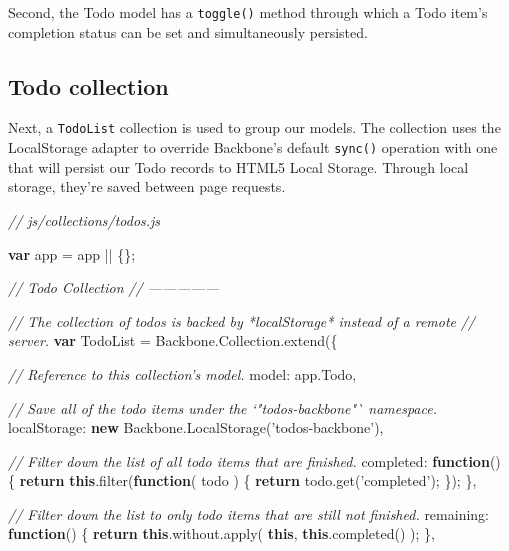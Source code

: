 \documentclass[9pt]{book}
\newenvironment{Shaded}{}{}
\newcommand{\KeywordTok}[1]{\textcolor[rgb]{0.00,0.44,0.13}{\textbf{{#1}}}}
\newcommand{\DataTypeTok}[1]{\textcolor[rgb]{0.56,0.13,0.00}{{#1}}}
\newcommand{\StringTok}[1]{\textcolor[rgb]{0.25,0.44,0.63}{{#1}}}
\newcommand{\CommentTok}[1]{\textcolor[rgb]{0.38,0.63,0.69}{\textit{{#1}}}}
\newcommand{\OtherTok}[1]{\textcolor[rgb]{0.00,0.44,0.13}{{#1}}}
\newcommand{\FunctionTok}[1]{\textcolor[rgb]{0.02,0.16,0.49}{{#1}}}
\newcommand{\NormalTok}[1]{{#1}}
\begin{document}
Second, the Todo model has a \texttt{toggle()} method through which a
Todo item's completion status can be set and simultaneously persisted.

\subsection{Todo collection}\label{todo-collection}

Next, a \texttt{TodoList} collection is used to group our models. The
collection uses the LocalStorage adapter to override Backbone's default
\texttt{sync()} operation with one that will persist our Todo records to
HTML5 Local Storage. Through local storage, they're saved between page
requests.

\begin{Shaded}
\begin{Highlighting}[]

  \CommentTok{// js/collections/todos.js}

  \KeywordTok{var} \NormalTok{app = app || \{\};}

  \CommentTok{// Todo Collection}
  \CommentTok{// ---------------}

  \CommentTok{// The collection of todos is backed by *localStorage* instead of a remote}
  \CommentTok{// server.}
  \KeywordTok{var} \NormalTok{TodoList = }\OtherTok{Backbone}\NormalTok{.}\OtherTok{Collection}\NormalTok{.}\FunctionTok{extend}\NormalTok{(\{}

    \CommentTok{// Reference to this collection's model.}
    \DataTypeTok{model}\NormalTok{: }\OtherTok{app}\NormalTok{.}\FunctionTok{Todo}\NormalTok{,}

    \CommentTok{// Save all of the todo items under the `"todos-backbone"` namespace.}
    \DataTypeTok{localStorage}\NormalTok{: }\KeywordTok{new} \OtherTok{Backbone}\NormalTok{.}\FunctionTok{LocalStorage}\NormalTok{(}\StringTok{'todos-backbone'}\NormalTok{),}

    \CommentTok{// Filter down the list of all todo items that are finished.}
    \DataTypeTok{completed}\NormalTok{: }\KeywordTok{function}\NormalTok{() \{}
      \KeywordTok{return} \KeywordTok{this}\NormalTok{.}\FunctionTok{filter}\NormalTok{(}\KeywordTok{function}\NormalTok{( todo ) \{}
        \KeywordTok{return} \OtherTok{todo}\NormalTok{.}\FunctionTok{get}\NormalTok{(}\StringTok{'completed'}\NormalTok{);}
      \NormalTok{\});}
    \NormalTok{\},}

    \CommentTok{// Filter down the list to only todo items that are still not finished.}
    \DataTypeTok{remaining}\NormalTok{: }\KeywordTok{function}\NormalTok{() \{}
      \KeywordTok{return} \KeywordTok{this}\NormalTok{.}\OtherTok{without}\NormalTok{.}\FunctionTok{apply}\NormalTok{( }\KeywordTok{this}\NormalTok{, }\KeywordTok{this}\NormalTok{.}\FunctionTok{completed}\NormalTok{() );}
    \NormalTok{\},}


\end{Highlighting}
\end{Shaded}
\end{document}
